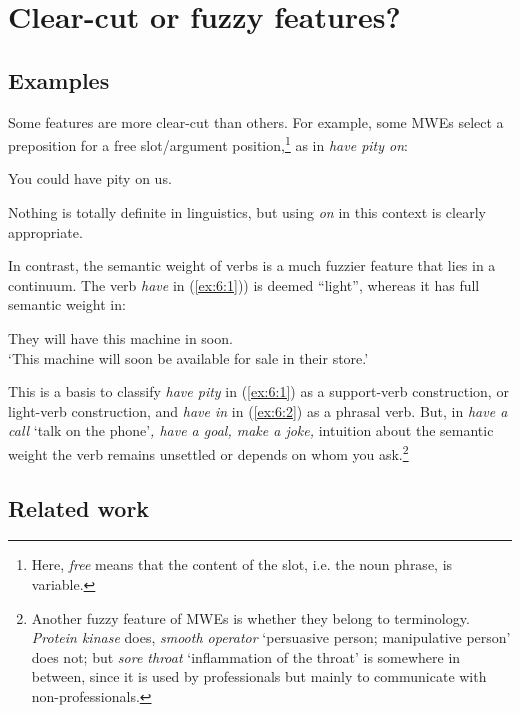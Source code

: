 \documentclass[output=paper]{langsci/langscibook}
\begin{document}
\section{Clear-cut or fuzzy features?}
\label{sec:2}

\subsection{Examples} 
\label{sec:221}

Some features are more clear-cut than others. For example, some MWEs select a preposition for a free slot/argument position,\footnote{ Here, \textit{free} means that the content of the slot, i.e. the noun phrase, is variable.} as in \textit{have pity on}:

\begin{exe}
 \ex   \label{ex:6:1}
You could have pity on us.
\end{exe}



\noindent Nothing is totally definite in linguistics, but using \textit{on} in this context is clearly appropriate.

In contrast, the semantic weight of verbs is a much fuzzier feature that lies in a continuum. The verb \textit{have} in (\ref{ex:6:1})) is deemed “light”, whereas it has full semantic weight in:

\begin{exe}
 \ex   \label{ex:6:2}
They will have this machine in soon.\\
`This machine will soon be available for sale in their store.'
\end{exe}


\noindent This is a basis to classify \textit{have pity} in (\ref{ex:6:1}) as a support-verb construction, or light-verb construction, and \textit{have in} in (\ref{ex:6:2})  as a phrasal verb. But, in \textit{have a call} ‘talk on the phone’\textit{, have a goal, make a joke,} intuition about the semantic weight the verb remains unsettled or depends on whom you 
ask.\footnote{Another fuzzy feature of MWEs is whether they belong to terminology.\textit{ Protein kinase} does, \textit{smooth operator} ‘persuasive person; manipulative person’ does not; but \textit{sore throat} ‘inflammation of the throat’ is somewhere in between, since it is used by professionals but mainly to communicate with non-professionals.}

\subsection{Related work} 
\label{22}
\end{document}
